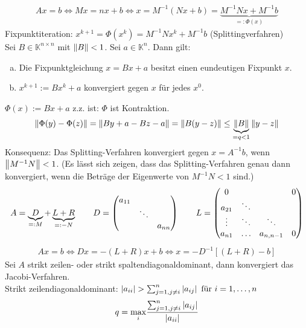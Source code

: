 \begin{align*}
  Ax = b \Leftrightarrow Mx = nx + b \Leftrightarrow x = M^{-1} (Nx+b) = \underbrace{M^{-1}Nx + M^{-1}b}_{=: \Phi(x)}
\end{align*}
Fixpunktiteration: $x^{k+1} = \Phi(x^k) = M^{-1}Nx^k + M^{-1}b$ (Splittingverfahren)\\
\satz Sei $B \in \mathbb{K}^{n \times n}$ mit $\left\lVert B \right\rVert < 1$. Sei $a \in \mathbb{K}^n$. Dann gilt:
\begin{enumerate}[a)]
  \item Die Fixpunktgleichung $x = Bx + a$ besitzt einen eundeutigen Fixpunkt $x$.
  \item $x^{k+1} := Bx^k + a$ konvergiert gegen $x$ für jedes $x^0$.
\end{enumerate}
\beweis $\Phi(x) := Bx + a$ z.z. ist: $\Phi$ ist Kontraktion.\\
\begin{align*}
  \left\lVert \Phi(y) - \Phi(z) \right\rVert = \left\lVert By + a - Bz - a \right\rVert = \left\lVert B(y - z) \right\rVert \leq \underbrace{\left\lVert B \right\rVert}_{= q < 1} \left\lVert y - z \right\rVert
\end{align*}
Konsequenz: Das Splitting-Verfahren konvergiert gegen $x = A^{-1}b$, wenn $\left\lVert M^{-1}N \right\rVert < 1$. (Es
lässt sich zeigen, dass das Splitting-Verfahren genau dann konvergiert, wenn die Beträge der Eigenwerte
von $M^{-1}N < 1$ sind.)
\begin{align*}
  A = \underbrace{D}_{=: M} + \underbrace{L + R}_{=: -N} \qquad D = \begin{pmatrix} a_{11} & & \\ & \ddots & \\ & & a_{nn} \end{pmatrix} \qquad
  L = \begin{pmatrix}
    0      &        &        & 0 \\
    a_{21} & \ddots &        &   \\
    \vdots & \ddots & \ddots &   \\
    a_{n1} & \ldots & a_{n,n-1} & 0
  \end{pmatrix}
\end{align*}
\begin{align*}
  Ax = b \Leftrightarrow Dx = -(L+R)x + b \Leftrightarrow x = -D^{-1} \left[ (L+R) - b \right]
\end{align*}
\satz Sei $A$ strikt zeilen- oder strikt spaltendiagonaldominant, dann konvergiert das Jacobi-Verfahren.\\
Strikt zeilendiagonaldominant: $\left| a_{ii} \right| > \sum^{n}_{j=1,j \neq i} \left| a_{ij} \right| \text{ für } i=1,\ldots,n$
\begin{align*}
  q = \underset{i}{\max} \frac{\sum^{n}_{j=1,j \neq i} \left| a_{ij} \right|}{\left| a_{ii} \right|}
\end{align*}
